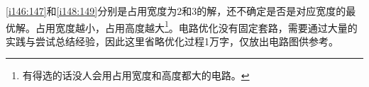 \begin{figure}[!ht]
\begin{center}
\qquad
{}
\end{center}
\caption{}
\label{i144:145}
\end{figure}

\autoref{i146:147}和\autoref{i148:149}分别是占用宽度为2和3的解，还不确定是否是对应宽度的最优解。占用宽度越小，占用高度越大\footnote{有得选的话没人会用占用宽度和高度都大的电路。}。电路优化没有固定套路，需要通过大量的实践与尝试总结经验，因此这里省略优化过程1万字，仅放出电路图供参考。

